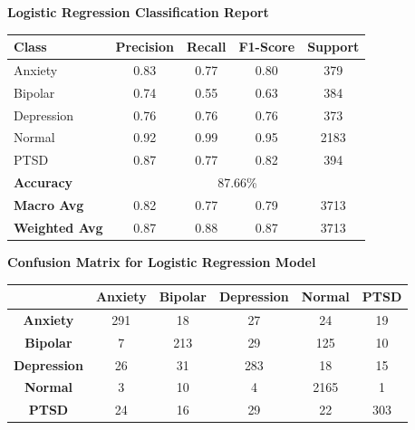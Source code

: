\begin{center}
    \textbf{Logistic Regression Classification Report} \\[0.5em]
    \begin{tabular}{|l|c|c|c|c|}
        \hline
        \textbf{Class} & \textbf{Precision} & \textbf{Recall} & \textbf{F1-Score} & \textbf{Support} \\ \hline
        Anxiety        & 0.83               & 0.77            & 0.80              & 379              \\ \hline
        Bipolar        & 0.74               & 0.55            & 0.63              & 384              \\ \hline
        Depression     & 0.76               & 0.76            & 0.76              & 373              \\ \hline
        Normal         & 0.92               & 0.99            & 0.95              & 2183             \\ \hline
        PTSD           & 0.87               & 0.77            & 0.82              & 394              \\ \hline
        \textbf{Accuracy} & \multicolumn{4}{|c|}{87.66\%} \\ \hline
        \textbf{Macro Avg} & 0.82            & 0.77            & 0.79              & 3713             \\ \hline
        \textbf{Weighted Avg} & 0.87         & 0.88            & 0.87              & 3713             \\ \hline
    \end{tabular}
\end{center}

\vspace{0.25em}

\begin{center}
    \textbf{Confusion Matrix for Logistic Regression Model} \\[0.5em]
    \begin{tabular}{|c|c|c|c|c|c|}
        \hline
        & \textbf{Anxiety} & \textbf{Bipolar} & \textbf{Depression} & \textbf{Normal} & \textbf{PTSD} \\ \hline
        \textbf{Anxiety}    & 291 & 18  & 27  & 24  & 19  \\ \hline
        \textbf{Bipolar}    & 7   & 213 & 29  & 125 & 10  \\ \hline
        \textbf{Depression} & 26  & 31  & 283 & 18  & 15  \\ \hline
        \textbf{Normal}     & 3   & 10  & 4   & 2165 & 1   \\ \hline
        \textbf{PTSD}       & 24  & 16  & 29  & 22  & 303 \\ \hline
    \end{tabular}
\end{center}

